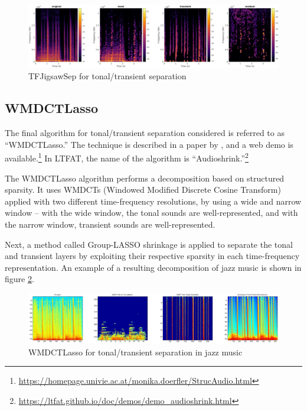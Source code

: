 \documentclass[letter,12pt]{article}
\begin{document}
\begin{figure}[ht]
	\centering
	\includegraphics[width=16cm]{./tfjigsaw-sep-example.png}
	\caption{TFJigsawSep for tonal/transient separation}
	\label{fig:tfjigsawdemo}
\end{figure}

\subsection{WMDCTLasso}

The final algorithm for tonal/transient separation considered is referred to as ``WMDCTLasso.'' The technique is described in a paper by \citet{wmdct}, and a web demo is available.\footnote{\url{https://homepage.univie.ac.at/monika.doerfler/StrucAudio.html}} In LTFAT, the name of the algorithm is ``Audioshrink.''\footnote{\url{https://ltfat.github.io/doc/demos/demo_audioshrink.html}}

The WMDCTLasso algorithm performs a decomposition based on structured sparsity. It uses WMDCTs (Windowed Modified Discrete Cosine Transform) applied with two different time-frequency resolutions, by using a wide and narrow window -- with the wide window, the tonal sounds are well-represented, and with the narrow window, transient sounds are well-represented.

Next, a method called Group-LASSO shrinkage is applied to separate the tonal and transient layers by exploiting their respective sparsity in each time-frequency representation. An example of a resulting decomposition of jazz music is shown in figure \ref{fig:wmdctex}.

\begin{figure}[ht]
	\centering
	\includegraphics[width=16cm]{./wmdctjazz.png}
	\caption{WMDCTLasso for tonal/transient separation in jazz music}
	\label{fig:wmdctex}
\end{figure}
\end{document}

